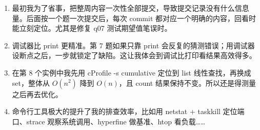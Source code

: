 \documentclass[UTF8]{ctexart}
\begin{document}
\begin{enumerate}[itemsep=2pt, topsep=3pt]
  \item 最初我为了省事，把整周内容一次性全部提交，导致提交记录没有什么信息量。后面按一个题一次提交后，每次 commit 都对应一个明确的内容，回看时能立刻定位。尤其是修复 q07 测试期望值笔误时。
  \item 调试器比 print 更精准。第 7 题如果只靠 print 会反复的猜测错误；用调试器设断点之后，一步就锁定了缺陷。这让我体会到调试比打印看结果高效得多。
  \item 在第 8 个实例中我先用 cProfile -s cumulative 定位到 list 线性查找，再换成 set，整体从 $O(n^2)$ 降到 $O(n)$，且 count 结果保持不变。所以还是得测量之后再去优化。
  \item 命令行工具极大的提升了我的排查效率，比如用 netstat + taskkill 定位端口、strace 观察系统调用、hyperfine 做基准、htop 看负载……
\end{enumerate}
\end{document}
